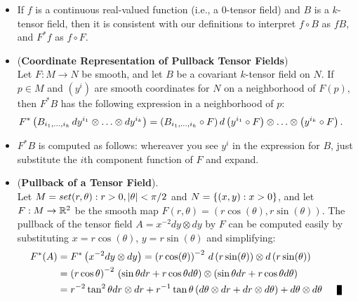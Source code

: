 \documentclass[11pt]{article}
\begin{document}
\begin{itemize}
\item \begin{remark}
If $f$ is a continuous real-valued function (i.e., a $0$-tensor field) and $B$ is a $k$-tensor field, then it is consistent with our definitions to interpret $f \circ B$ as $fB$, and
$F^{*}f$ as $f \circ F$. 
\end{remark}

\item \begin{corollary} (\textbf{Coordinate Representation of Pullback Tensor Fields})\\
Let $F: M \rightarrow N$  be smooth, and let $B$ be a covariant $k$-tensor field on $N$. If $p \in M$ and $(y^i)$ are smooth coordinates for $N$ on a neighborhood of $F(p)$, then $F^{*}B$ has the following expression in a neighborhood of $p$:
\begin{align*}
F^{*}\left(B_{i_1,\ldots,i_k}\,dy^{i_1} \otimes \ldots \otimes dy^{i_k}\right) &=  \left(B_{i_1,\ldots,i_k} \circ F\right) d\left(y^{i_1} \circ F\right) \otimes \ldots \otimes \left(y^{i_k} \circ F\right).
\end{align*}
\end{corollary}

\item \begin{remark}
$F^{*}B$ is computed as follows: whereaver you see $y^i$ in the expression for $B$, just substitute the $i$th component function of $F$ and expand.
\end{remark}

\item \begin{exercise} (\textbf{Pullback of a Tensor Field}). \\
Let $M = set{(r, \theta): r > 0, \left\lvert \theta \right\rvert < \pi/ 2}$ and $N= \left\{(x, y): x > 0\right\}$, and let $F: M \rightarrow {\mathbb R}^2$ be the smooth map $F(r, \theta) = (r\cos(\theta), r\sin(\theta))$. The pullback of the tensor field $A = x^{-2}dy \otimes dy$ by $F$ can be computed easily by substituting $x = r\cos(\theta)$, $y =r\sin(\theta)$ and simplifying:
\begin{align*}
F^{*}(A) &= F^{*}\paren{x^{-2}dy \otimes dy}  = \paren{r\cos(\theta)}^{-2}\,d\paren{r\sin(\theta)} \otimes d\paren{r\sin(\theta)} \\
&= \paren{r\cos \theta}^{-2}\,\paren{\sin\theta dr + r\cos\theta d\theta} \otimes \paren{\sin \theta dr + r\cos \theta d\theta} \\
&= r^{-2} \tan^2\theta dr \otimes dr + r^{-1} \tan\theta\paren{d\theta \otimes dr + dr \otimes d\theta} + d\theta \otimes d\theta \qed
\end{align*}
\end{exercise}

\end{itemize}
\end{document}
